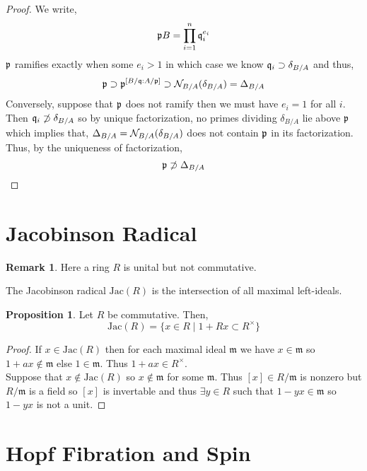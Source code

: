 \documentclass[12pt]{extarticle}
\theoremstyle{definition}
\newtheorem{proposition}[theorem]{Proposition}
\newtheorem{remark}{Remark}
\newenvironment{definition}[1][Definition:]{\begin{trivlist}
\item[\hskip \labelsep {\bfseries #1}]}{\end{trivlist}}
\newcommand{\m}{\mathfrak{m}}
\begin{document}
\begin{proof}
We write,
\[ \mathfrak{p} B = \prod_{i = 1}^n \mathfrak{q}_i^{e_i} \]
$\mathfrak{p}$ ramifies exactly when some $e_i > 1$ in which case we know $\mathfrak{q}_i \supset \delta_{B/A}$ and thus,
\[ \mathfrak{p} \supset \mathfrak{p}^{[B / \mathfrak{q} : A / \mathfrak{p}]} \supset \mathcal{N}_{B / A}(\delta_{B/A}) = \Delta_{B/A} \]
Conversely, suppose that $\mathfrak{p}$ does not ramify then we must have $e_i = 1$ for all $i$. Then $\mathfrak{q}_i \not\supset \delta_{B/A}$ so by unique factorization, no primes dividing $\delta_{B/A}$ lie above $\mathfrak{p}$ which implies that, $\Delta_{B/A} = \mathcal{N}_{B/A}(\delta_{B/A})$ does not contain $\mathfrak{p}$ in its factorization. Thus, by the uniqueness of factorization,
\[ \mathfrak{p} \not\supset \Delta_{B/A} \]
\end{proof}



\section{Jacobinson Radical}

\newcommand{\Jac}[1]{\mathrm{Jac}\left( #1 \right)}

\begin{remark}
Here a ring $R$ is unital but not commutative.
\end{remark}


\begin{definition}
The Jacobinson radical $\Jac{R}$ is the intersection of all maximal left-ideals.
\end{definition}

\begin{proposition}
Let $R$ be commutative. Then,
\[ \Jac{R} = \{ x \in R \mid 1 + R x \subset R^\times \} \]
\end{proposition}

\begin{proof}
If $x \in \Jac{R}$ then for each maximal ideal $\m$ we have $x \in \m$ so $1 + a x \notin \m$ else $1 \in \m$. Thus $1 + ax \in R^\times$. 
\bigskip\\
Suppose that $x \notin \Jac{R}$ so $x \notin \m$ for some $\m$. Thus $[x] \in R / \m$ is nonzero but $R / \m$ is a field so $[x]$ is invertable and thus $\exists y \in R$ such that $1 - yx \in \m$ so $1 - yx$ is not a unit. 
\end{proof}

\section{Hopf Fibration and Spin}
\end{document}
